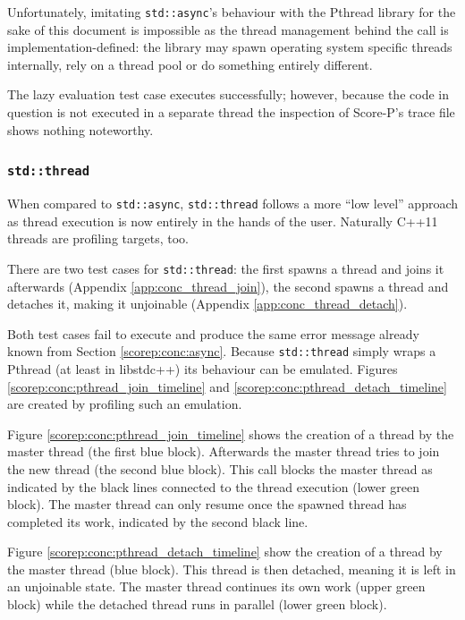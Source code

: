 \noindent Unfortunately, imitating \texttt{std::async}'s behaviour with the Pthread library for the sake of this document is impossible as the thread management behind the call is implementation-defined: the library may spawn operating system specific threads internally, rely on a thread pool or do something entirely different.

The lazy evaluation test case executes successfully; however, because the code in question is not executed in a separate thread the inspection of Score-P's trace file shows nothing noteworthy.

\subsubsection{\texttt{std::thread}}\label{scorep:conc:thread}

When compared to \texttt{std::async}, \texttt{std::thread} follows a more ``low level'' approach as thread execution is now entirely in the hands of the user. Naturally C++11 threads are profiling targets, too.

There are two test cases for \texttt{std::thread}: the first spawns a thread and joins it afterwards (Appendix \ref{app:conc_thread_join}), the second spawns a thread and detaches it, making it unjoinable (Appendix \ref{app:conc_thread_detach}).

Both test cases fail to execute and produce the same error message already known from Section \ref{scorep:conc:async}. Because \texttt{std::thread} simply wraps a Pthread (at least in libstdc++) its behaviour can be emulated. Figures \ref{scorep:conc:pthread_join_timeline} and \ref{scorep:conc:pthread_detach_timeline} are created by profiling such an emulation.

Figure \ref{scorep:conc:pthread_join_timeline} shows the creation of a thread by the master thread (the first blue block). Afterwards the master thread tries to join the new thread (the second blue block). This call blocks the master thread as indicated by the black lines connected to the thread execution (lower green block). The master thread can only resume once the spawned thread has completed its work, indicated by the second black line.

Figure \ref{scorep:conc:pthread_detach_timeline} show the creation of a thread by the master thread (blue block). This thread is then detached, meaning it is left in an unjoinable state. The master thread continues its own work (upper green block) while the detached thread runs in parallel (lower green block).

